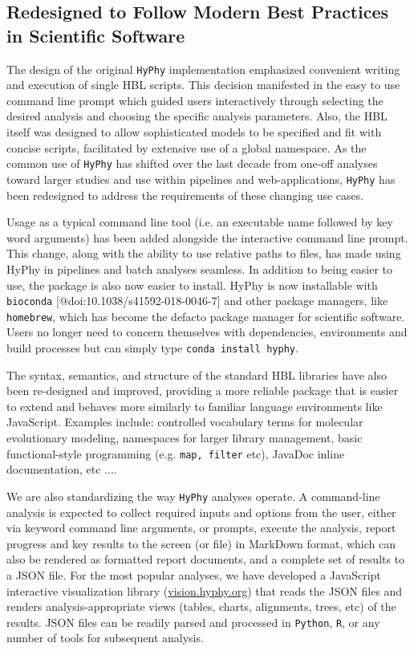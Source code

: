 \documentclass[nogrid]{MBE}%
\newcommand{\sw}[1]{{\tt #1}}
\newcommand{\hyphy}{{\tt HyPhy}}
\begin{document}
\subsection{Redesigned to Follow Modern Best Practices in Scientific Software  }

The design of the original \hyphy{} implementation emphasized convenient writing
and execution of single HBL scripts.  This decision manifested in the easy to
use command line prompt which guided users interactively through selecting the
desired analysis and choosing the specific analysis parameters.  Also, the HBL
itself was designed to allow sophisticated models to be specified and fit with
concise scripts, facilitated by extensive use of a global namespace.  As the
common use of \hyphy{} has shifted over the last decade from one-off analyses
toward larger studies and use within pipelines and web-applications, \hyphy{}
has  been redesigned to address the requirements of these changing use cases.   

Usage as a typical command line tool (i.e. an executable name followed by key
word arguments) has been added alongside the interactive command line prompt.
This change, along with the ability to use relative paths to files, has made
using HyPhy in pipelines and batch analyses seamless. In addition to being
easier to use, the package is also now easier to install. HyPhy is now
installable with \sw{bioconda} [@doi:10.1038/s41592-018-0046-7] and other
package managers, like \sw{homebrew}, which has become the defacto package
manager for scientific software. Users no longer need to concern themselves with
dependencies, environments and build processes but can simply type \sw{conda
install hyphy}.

The syntax, semantics, and structure of the standard HBL libraries have also
been re-designed and improved, providing a more reliable package that is easier
to extend and behaves more similarly to familiar language environments like
JavaScript.  Examples include: controlled vocabulary terms for molecular
evolutionary modeling, namespaces for larger library management, basic
functional-style programming (e.g. \sw{map, filter} etc), JavaDoc inline
documentation, etc ....

We are also standardizing the way \hyphy{} analyses operate. A command-line
analysis is expected to collect required inputs and options from the user,
either via keyword command line arguments, or prompts, execute the analysis,
report progress and key results to the screen (or file) in MarkDown format,
which can also be rendered as formatted report documents, and a complete set of
results to a JSON file. For the most popular analyses, we have developed a
JavaScript interactive visualization library (\url{vision.hyphy.org}) that reads
the JSON files and renders analysis-appropriate views (tables, charts,
alignments, trees, etc) of the results. JSON files can be readily parsed and
processed in \sw{Python}, \sw{R}, or any number of tools for subsequent
analysis. 
\end{document}
